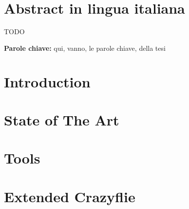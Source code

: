 \documentclass{Configuration_Files/PoliMi3i_thesis}
\begin{document}
\chapter*{Abstract in lingua italiana}
TODO



\textbf{Parole chiave:} qui, vanno, le parole chiave, della tesi %


\thispagestyle{empty}
\tableofcontents %
\thispagestyle{empty}
\cleardoublepage


\mainmatter %

\chapter{Introduction}
\label{ch:intro}


\chapter{State of The Art}
\label{ch:soa}


\chapter{Tools}
\label{ch:tools}


\chapter{Extended Crazyflie}
\label{ch:ecf}

\end{document}
